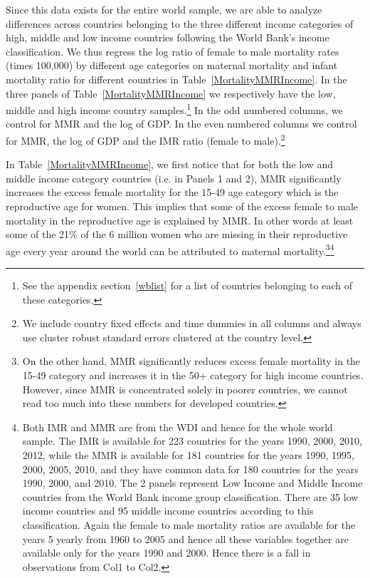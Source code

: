 \documentclass[11pt]{article}
\begin{document}
\begin{spacing}{1.4}
Since this data exists for the entire world sample, we are able to analyze differences across countries belonging to the three different income categories of high, middle and low income countries following the World Bank's income classification. We thus regress the log ratio of female to male mortality rates (times 100,000) by different age categories on maternal mortality and infant mortality ratio for different countries in Table~\ref{MortalityMMRIncome}. In the three panels of Table~\ref{MortalityMMRIncome} we respectively have the low, middle and high income country samples.\footnote{See the appendix section~\ref{wblist} for a list of countries belonging to each of these categories.} In the odd numbered columns, we control for MMR and the log of GDP. In the even numbered columns we control for MMR, the log of GDP and the IMR ratio (female to male).\footnote{We include country fixed effects and time dummies in all columns and always use cluster robust standard errors clustered at the country level.}  

In Table~\ref{MortalityMMRIncome}, we first notice that for both the low and middle income category countries (i.e. in Panels 1 and 2), MMR significantly increases the excess female mortality for the 15-49 age category which is the reproductive age for women. This implies that some of the excess female to male mortality in the reproductive age is explained by MMR. In other words at least some of the 21\% of the 6 million women who are missing in their reproductive age every year around the world can be attributed to maternal mortality.\footnote{On the other hand, MMR significantly reduces excess female mortality in the 15-49 category and increases it in the 50+ category for high income countries. However, since MMR is concentrated solely in poorer countries, we cannot read too much into these numbers for developed countries.}\footnote{Both IMR and MMR are from the WDI and hence for the whole world sample. The IMR is available for 223 countries for the years 1990, 2000, 2010, 2012, while the MMR is available for 181 countries for the years 1990, 1995, 2000, 2005, 2010, and they have common data for 180 countries for the years 1990, 2000, and 2010. The 2 panels represent Low Income and Middle Income countries from the World Bank income group classification. There are 35 low income countries and 95 middle income countries according to this classification.  Again the female to male mortality ratios are available for the years 5 yearly from 1960 to 2005 and hence all these variables together are available only for the years 1990 and 2000. Hence there is a fall in observations from Col1 to Col2.} 



\end{spacing}
\end{document}
